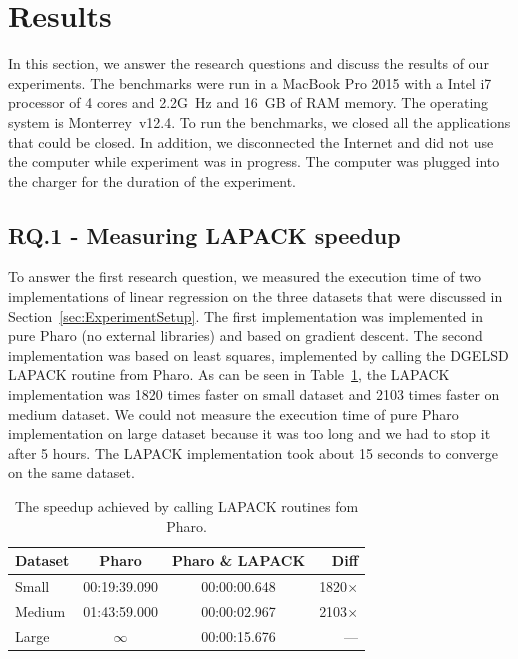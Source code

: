 \documentclass[]{ceurart}
\begin{document}

\section{Results}
\label{sec:Results}

In this section, we answer the research questions and discuss the results of our experiments.
The benchmarks were run in a MacBook Pro 2015 with a Intel i7 processor of 4 cores and 2.2G~Hz and 16~GB of RAM memory.
The operating system is Monterrey~v12.4.
To run the benchmarks, we closed all the applications that could be closed.
In addition, we disconnected the Internet and did not use the computer while experiment was in progress. The computer was plugged into the charger for the duration of the experiment.

\subsection*{RQ.1 - Measuring LAPACK speedup}

To answer the first research question, we measured the execution time of two implementations of linear regression on the three datasets that were discussed in Section~\ref{sec:ExperimentSetup}.
The first implementation was implemented in pure Pharo (no external libraries) and based on gradient descent.
The second implementation was based on least squares, implemented by calling the DGELSD LAPACK routine from Pharo.
As can be seen in Table~\ref{tab:LAPACKSpeedup}, the LAPACK implementation was 1820 times faster on small dataset and 2103 times faster on medium dataset.
We could not measure the execution time of pure Pharo implementation on large dataset because it was too long and we had to stop it after 5 hours.
The LAPACK implementation took about 15 seconds to converge on the same dataset. 

\begin{table}[htbp]
\centering
\caption{The speedup achieved by calling LAPACK routines fom Pharo.}
\begin{tabular}{l|cc|r}
\hline
\textbf{Dataset} & \textbf{Pharo} & \textbf{Pharo \& LAPACK} & \textbf{Diff} \\
\hline
Small & 00:19:39.090 & 00:00:00.648 & 1820$\times$ \\
Medium & 01:43:59.000 & 00:00:02.967 & 2103$\times$ \\
Large & $\infty$ & 00:00:15.676 & --- \\
\hline
\end{tabular}
\label{tab:LAPACKSpeedup}
\end{table}
\end{document}
